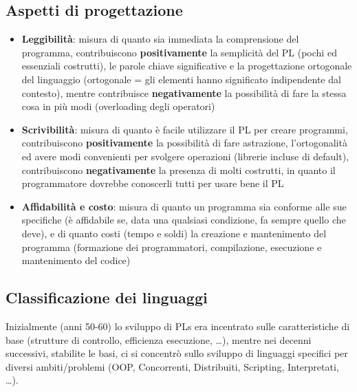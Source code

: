 \documentclass[12pt,a4paper]{article}
\begin{document}
\subsection{Aspetti di progettazione}
\begin{itemize}
\item \textbf{Leggibilità}: misura di quanto sia immediata la comprensione del programma, contribuiscono \textbf{positivamente} la semplicità del PL (pochi ed essenziali costrutti), le parole chiave significative e la progettazione ortogonale del linguaggio (ortogonale = gli elementi hanno significato indipendente dal contesto), mentre contribuisce \textbf{negativamente} la possibilità di fare la stessa cosa in più modi (overloading degli operatori)

\item \textbf{Scrivibilità}: misura di quanto è facile utilizzare il PL per creare programmi,
contribuiscono \textbf{positivamente} la possibilità di fare astrazione, l'ortogonalità ed avere modi convenienti per svolgere operazioni (librerie incluse di default), contribuiscono \textbf{negativamente} la presenza di molti costrutti, in quanto il programmatore dovrebbe conoscerli tutti per usare bene il PL

\item \textbf{Affidabilità e costo}: misura di quanto un programma sia conforme alle sue specifiche (è affidabile se, data una qualsiasi condizione, fa sempre quello che deve), e di quanto costi (tempo e soldi) la creazione e mantenimento del programma (formazione dei programmatori, compilazione, esecuzione e mantenimento del codice)
\end{itemize}

\subsection{Classificazione dei linguaggi}
Inizialmente (anni 50-60) lo sviluppo di PLs era incentrato sulle caratteristiche di base (strutture di controllo, efficienza esecuzione, \ldots), mentre nei decenni successivi, stabilite le basi, ci si concentrò sullo sviluppo di linguaggi specifici per diversi ambiti\slash problemi (OOP, Concorrenti, Distribuiti, Scripting, Interpretati, \ldots).
\end{document}
